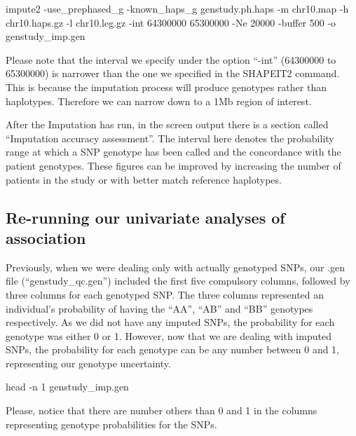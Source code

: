 \documentclass[]{book}
\newenvironment{Shaded}{\begin{snugshade}}{\end{snugshade}}
\newcommand{\FunctionTok}[1]{\textcolor[rgb]{0.00,0.00,0.00}{#1}}
\newcommand{\ExtensionTok}[1]{#1}
\newcommand{\NormalTok}[1]{#1}
\begin{document}
\begin{Shaded}
\begin{Highlighting}[]
\ExtensionTok{impute2}\NormalTok{ -use_prephased_g -known_haps_g genstudy.ph.haps -m chr10.map -h chr10.haps.gz -l chr10.leg.gz -int 64300000 65300000 -Ne 20000 -buffer 500 -o genstudy_imp.gen}
\end{Highlighting}
\end{Shaded}

Please note that the interval we specify under the option ``-int''
(64300000 to 65300000) is narrower than the one we specified in the
SHAPEIT2 command. This is because the imputation process will produce
genotypes rather than haplotypes. Therefore we can narrow down to a 1Mb
region of interest.

After the Imputation has run, in the screen output there is a section
called ``Imputation accuracy assessment''. The interval here denotes the
probability range at which a SNP genotype has been called and the
concordance with the patient genotypes. These figures can be improved by
increasing the number of patients in the study or with better match
reference haplotypes.

\subsection{Re-running our univariate analyses of
association}\label{re-running-our-univariate-analyses-of-association}

Previously, when we were dealing only with actually genotyped SNPs, our
.gen file (``genstudy\_qc.gen'') included the first five compulsory
columns, followed by three columns for each genotyped SNP. The three
columns represented an individual's probability of having the ``AA'',
``AB'' and ``BB'' genotypes respectively. As we did not have any imputed
SNPs, the probability for each genotype was either 0 or 1. However, now
that we are dealing with imputed SNPs, the probability for each genotype
can be any number between 0 and 1, representing our genotype
uncertainty.

\begin{Shaded}
\begin{Highlighting}[]
\FunctionTok{head}\NormalTok{ -n 1 genstudy_imp.gen}
\end{Highlighting}
\end{Shaded}

Please, notice that there are number others than 0 and 1 in the columns
representing genotype probabilities for the SNPs.
\end{document}
